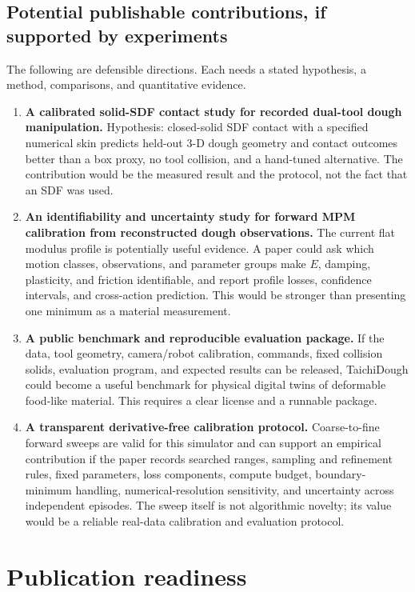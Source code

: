 \documentclass[11pt]{article}
\begin{document}
\subsection*{Potential publishable contributions, if supported by experiments}

The following are defensible directions. Each needs a stated hypothesis, a method, comparisons, and quantitative evidence.

\begin{enumerate}[leftmargin=1.45em]
  \item \textbf{A calibrated solid-SDF contact study for recorded dual-tool dough manipulation.} Hypothesis: closed-solid SDF contact with a specified numerical skin predicts held-out 3-D dough geometry and contact outcomes better than a box proxy, no tool collision, and a hand-tuned alternative. The contribution would be the measured result and the protocol, not the fact that an SDF was used.
  \item \textbf{An identifiability and uncertainty study for forward MPM calibration from reconstructed dough observations.} The current flat modulus profile is potentially useful evidence. A paper could ask which motion classes, observations, and parameter groups make $E$, damping, plasticity, and friction identifiable, and report profile losses, confidence intervals, and cross-action prediction. This would be stronger than presenting one minimum as a material measurement.
  \item \textbf{A public benchmark and reproducible evaluation package.} If the data, tool geometry, camera/robot calibration, commands, fixed collision solids, evaluation program, and expected results can be released, TaichiDough could become a useful benchmark for physical digital twins of deformable food-like material. This requires a clear license and a runnable package.
  \item \textbf{A transparent derivative-free calibration protocol.} Coarse-to-fine forward sweeps are valid for this simulator and can support an empirical contribution if the paper records searched ranges, sampling and refinement rules, fixed parameters, loss components, compute budget, boundary-minimum handling, numerical-resolution sensitivity, and uncertainty across independent episodes. The sweep itself is not algorithmic novelty; its value would be a reliable real-data calibration and evaluation protocol.
\end{enumerate}

\section{Publication readiness}
\end{document}
